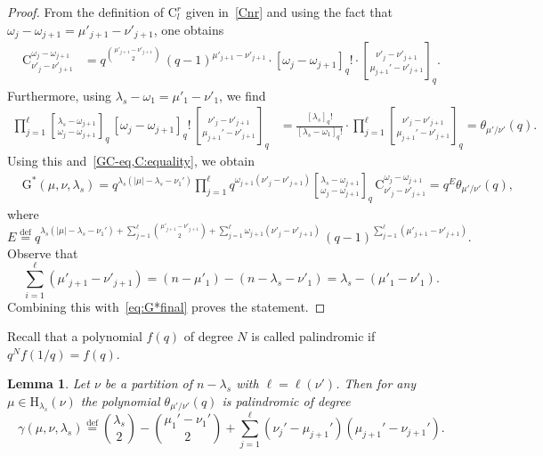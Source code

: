 \documentclass[12pt,a4paper,reqno]{amsart}
\theoremstyle{plain}
\newtheorem{lemma}[theorem]{Lemma}
\theoremstyle{definition}
\newcommand{\defin}{\overset{\mathrm{def}}{=}}
\newcommand{\1}{\mathds{1}}
\newcommand{\G}{{\mathrm{G}}}
\newcommand{\HH}{\mathrm{H}}
\begin{document}
\begin{proof}
From the definition of $\mathrm{C}^r_l$ given in~\cref{Cnr} and using the fact that $\omega_j-\omega_{j+1}=\mu'_{j+1}-\nu'_{j+1}$, one obtains
\begin{equation}\label{C:equality}
    \begin{split}
        \mathrm{C}_{\nu'_j-\nu'_{j+1}}^{\omega_j-\omega_{j+1}}&=q^{\binom{\mu'_{j+1}-\nu'_{j+1}}{2}}\,(q-1)^{\mu'_{j+1}-\nu'_{j+1}} \cdot [\omega_j-\omega_{j+1}]_q! \cdot {\nu'_j-\nu'_{j+1} \brack \mu_{j+1}'-\nu'_{j+1}}_q.
    \end{split}
\end{equation}
Furthermore, using $\lambda_s-\omega_1=\mu'_1-\nu'_1$, we find
\begin{align*}
\prod_{j=1}^{\ell} {\lambda_s-\omega_{j+1} \brack \omega_j-\omega_{j+1}}_q\, [\omega_j-\omega_{j+1}]_q!\, {\nu'_j-\nu'_{j+1} \brack \mu_{j+1}'-\nu'_{j+1}}_q&=\frac{[\lambda_s]_q!}{[\lambda_s-\omega_1]_q!}\cdot\prod_{j=1}^\ell {\nu'_j-\nu'_{j+1} \brack \mu_{j+1}'-\nu'_{j+1}}_q
=\theta_{\mu'/\nu'}(q).
\end{align*}
Using this and~\cref{GC-eq,C:equality}, we obtain
\begin{equation}
\label{eq:G*final}
\begin{split}
&\G^*(\mu,\nu,\lambda_s)=q^{\lambda_s(|\mu|-\lambda_s-\nu_1')}\prod_{j=1}^{\ell}q^{\omega_{j+1}(\nu'_j-\nu'_{j+1})}{\lambda_s-\omega_{j+1}\brack \omega_{j}-\omega_{j+1}}_q\,\mathrm{C}^{\omega_j-\omega_{j+1}}_{\nu'_j-\nu'_{j+1}}
=
q^E\theta_{\mu'/\nu'}(q)
,
\end{split}
\end{equation}
where 
\begin{equation}\label{dif:E}
E\defin  q^{\lambda_s(|\mu|-\lambda_s-\nu_1')+\sum_{j=1}^\ell\binom{\mu'_{j+1}-\nu'_{j+1}}{2}+\sum_{j=1}^\ell \omega_{j+1}(\nu'_j-\nu'_{j+1})}\, (q-1)^{\sum_{j=1}^\ell\left(\mu'_{j+1}-\nu'_{j+1}\right)}.
\end{equation}
Observe that
$$
\sum_{i=1}^\ell(\mu'_{j+1}-\nu'_{j+1})=(n-\mu'_1)-(n-\lambda_s-\nu'_1)=\lambda_s-(\mu'_1-\nu'_1). 
$$
Combining this with~\cref{eq:G*final} proves the statement.  
\end{proof}
Recall that a polynomial $f(q)$ of degree $N$ is called palindromic if $q^Nf(1/q)=f(q)$.
\begin{lemma}\label{deg_gama:lemma}
    Let $\nu$ be a partition of $n-\lambda_s$ with $\ell=\ell(\nu')$. Then for any $\mu\in\HH_{\lambda_s}(\nu)$ the polynomial $\theta_{\mu'/\nu'}(q)$ is palindromic of degree
    \begin{equation*}
        \gamma(\mu,\nu,\lambda_s)\defin\binom{\lambda_s}{2}-\binom{\mu_1'-\nu_1'}{2}+\sum_{j=1}^\ell (\nu_j'-\mu_{j+1}')(\mu_{j+1}'-\nu_{j+1}').
   \end{equation*}
\end{lemma}
\end{document}
